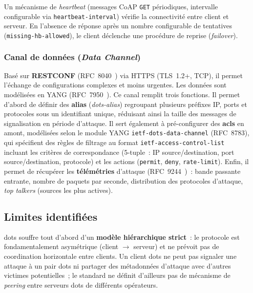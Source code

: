 Un mécanisme de \textit{heartbeat} (messages CoAP \texttt{GET} périodiques, intervalle configurable via \texttt{heartbeat-interval}) vérifie la connectivité entre client et serveur. En l'absence de réponse après un nombre configurable de tentatives (\texttt{missing-hb-allowed}), le client déclenche une procédure de reprise (\textit{failover}).

\subsubsection{Canal de données (\textit{Data Channel})}

Basé sur \textbf{RESTCONF} (RFC~8040~\parencite{rfc8040restconf}) via HTTPS (TLS~1.2+, TCP), il permet l'échange de configurations complexes et moins urgentes. Les données sont modélisées en YANG (RFC~7950~\parencite{rfc7950yang}). Ce canal remplit trois fonctions. Il permet d'abord de définir des \textbf{alias} (\textit{dots-alias}) regroupant plusieurs préfixes IP, ports et protocoles sous un identifiant unique, réduisant ainsi la taille des messages de signalisation en période d'attaque. Il sert également à pré-configurer des \textbf{\glspl{acl}} en amont, modélisées selon le module YANG \texttt{ietf-dots-data-channel} (RFC~8783), qui spécifient des règles de filtrage au format \texttt{ietf-access-control-list} incluant les critères de correspondance (5-tuple~: IP source/destination, port source/destination, protocole) et les actions (\texttt{permit}, \texttt{deny}, \texttt{rate-limit}). Enfin, il permet de récupérer les \textbf{télémétries} d'attaque (RFC~9244~\parencite{rfc9244dotstelemetry})~: bande passante entrante, nombre de paquets par seconde, distribution des protocoles d'attaque, \textit{top talkers} (sources les plus actives).




\subsection{Limites identifiées}

\gls{dots} souffre tout d'abord d'un \textbf{modèle hiérarchique strict}~: le protocole est fondamentalement asymétrique (client $\rightarrow$ serveur) et ne prévoit pas de coordination horizontale entre clients. Un client \gls{dots} ne peut pas signaler une attaque à un pair \gls{dots} ni partager des métadonnées d'attaque avec d'autres victimes potentielles~; le standard ne définit d'ailleurs pas de mécanisme de \textit{peering} entre serveurs \gls{dots} de différents opérateurs.

